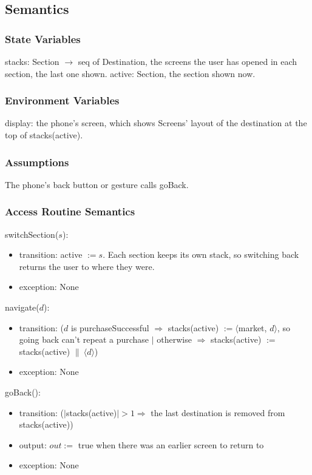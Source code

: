 \documentclass[12pt, titlepage]{article}
\begin{document}
\subsection{Semantics}

\subsubsection{State Variables}

\noindent stacks: Section $\rightarrow$ seq of Destination, the screens the
user has opened in each section, the last one shown. active: Section, the
section shown now.

\subsubsection{Environment Variables}

\noindent display: the phone's screen, which shows Screens' layout of the
destination at the top of stacks(active).

\subsubsection{Assumptions}

The phone's back button or gesture calls goBack.

\subsubsection{Access Routine Semantics}

\noindent switchSection($s$):
\begin{itemize}
\item transition: active $:= s$. Each section keeps its own stack, so
  switching back returns the user to where they were.
\item exception: None
\end{itemize}

\noindent navigate($d$):
\begin{itemize}
\item transition: ($d$ is purchaseSuccessful $\Rightarrow$ stacks(active) $:=
  \langle$market, $d\rangle$, so going back can't repeat a purchase $|$
  otherwise $\Rightarrow$ stacks(active) $:=$ stacks(active) $\|\ \langle d
  \rangle$)
\item exception: None
\end{itemize}

\noindent goBack():
\begin{itemize}
\item transition: ($|$stacks(active)$| > 1 \Rightarrow$ the last destination is
  removed from stacks(active))
\item output: $out :=$ true when there was an earlier screen to return to
\item exception: None
\end{itemize}
\end{document}
